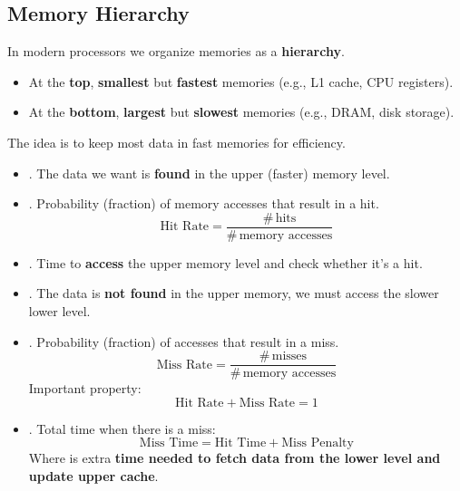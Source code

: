 \subsection{Memory Hierarchy}\label{subsection: Memory Hierarchy}

In modern processors we organize memories as a \textbf{hierarchy}.
\begin{itemize}
    \item At the \textbf{top}, \textbf{smallest} but \textbf{fastest} memories (e.g., L1 cache, CPU registers).
    \item At the \textbf{bottom}, \textbf{largest} but \textbf{slowest} memories (e.g., DRAM, disk storage).
\end{itemize}
The idea is to keep most data in fast memories for efficiency.
\begin{itemize}
    \item {}. The data we want is \textbf{found} in the upper (faster) memory level.

    \item {}. Probability (fraction) of memory accesses that result in a hit.
    \begin{equation}
        \text{Hit Rate} = \dfrac{\#\,\text{hits}}{\#\,\text{memory accesses}}
    \end{equation}

    \item {}. Time to \textbf{access} the upper memory level and check whether it's a hit.

    \item {}. The data is \textbf{not found} in the upper memory, we must access the slower lower level.

    \item {}. Probability (fraction) of accesses that result in a miss.
    \begin{equation}
        \text{Miss Rate} = \frac{\#\,\text{misses}}{\#\,\text{memory accesses}}
    \end{equation}
    Important property:
    \begin{equation}
        \text{Hit Rate} + \text{Miss Rate} = 1
    \end{equation}

    \item {}. Total time when there is a miss:
    \begin{equation}\label{eq: Miss Time}
        \text{Miss Time} = \text{Hit Time} + \text{Miss Penalty}
    \end{equation}
    Where  is extra \textbf{time needed to fetch data from the lower level and update upper cache}.
\end{itemize}

